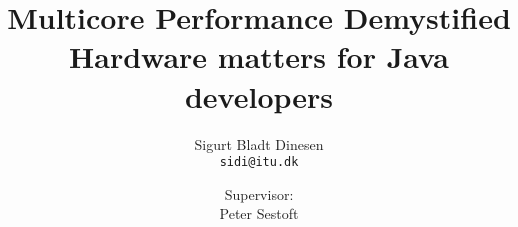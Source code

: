 \documentclass[a4paper, titlepage]{report}
\renewcommand{\%}{\protect\scalebox{.9}{\oldpct}}
\begin{document}
\title{Multicore Performance Demystified\\
\hfill \break
\large Hardware matters for Java developers
}
\author{
	Sigurt Bladt Dinesen
	\\\texttt{sidi@itu.dk}
	\and
	Supervisor:
	\\Peter Sestoft
}

\maketitle
\tableofcontents
\clearpage

















\clearpage
\nocite{*}


\end{document}
